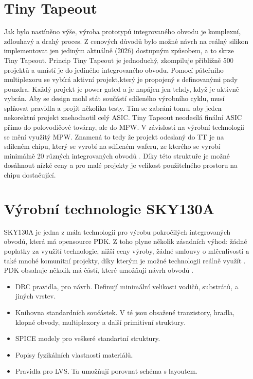 \section{Tiny Tapeout}
Jak bylo nastíněno výše, výroba prototypů integrovaného obvodu je komplexní, zdlouhavý a drahý proces. Z cenových důvodů bylo možné návrh na reálný silikon implementovat jen jediným aktuálně (2026) dostupným způsobem, a to skrze Tiny Tapeout. 
Princip Tiny Tapeout je jednoduchý, zkompiluje přibližně 500 projektů a umístí je do jediného integrovaného obvodu. Pomocí páteřního multiplexoru se vybírá aktivní projekt,který je propojený s definovanými pady pouzdra. Každý projekt je power gated a je napájen jen tehdy, když je aktivně vybrán. Aby se design mohl stát součástí sdíleného výrobního cyklu, musí splňovat pravidla a projít několika testy. Tím se zabrání tomu, aby jeden nekorektní projekt znehodnotil celý ASIC. 
Tiny Tapeout neodesílá finální ASIC přímo do polovodičové továrny, ale do MPW. V závislosti na výrobní technologii se mění využitý MPW. Znamená to tedy že projekt odeslaný do TT je na sdíleném chipu, který se vyrobí na sdíleném waferu, ze kterého se vyrobí minimálně 20 různých integrovaných obvodů \cite{Venn2024,chipfoundry_howitworks} . Díky této struktuře je možné dosáhnout nízké ceny a pro malé projekty je velikost použitelného prostoru na chipu dostačující.
\section{Výrobní technologie SKY130A}
SKY130A je jedna z mála technologií pro výrobu pokročilých integrovaných obvodů, která má opensource PDK. Z toho plyne několik zásadních výhod: žádné poplatky za využití technologie, nižší ceny výroby, žádné smlouvy o mlčenlivosti a také mnohé komunitní projekty, 
díky kterým je možné technologii reálně využít \cite{skywater_sky130A}.\newline
PDK obsahuje několik má částí, které umožňují návrh obvodů \cite{STG2020}.
\begin{itemize}
  \item DRC pravidla, pro návrh. Definují minimální velikosti vodičů, substrátů, a jiných vrstev.
  \item Knihovna standardních součástek. V té jsou obsažené tranzistory, hradla, klopné obvody, multiplexory a další primitivní struktury.
  \item SPICE modely pro veškeré standartní struktury.
  \item Popisy fyzikálních vlastností materiálů.
  \item Pravidla pro LVS. Ta umožňují porovnat schéma s layoutem.
\end{itemize}

